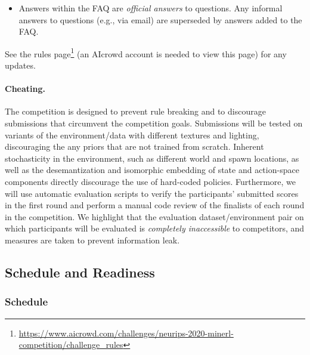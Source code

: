 \begin{itemize}
\begin{itemize}
    \item Answers within the FAQ are \textit{official answers} to questions. Any informal answers to questions (e.g., via email) are superseded by answers added to the FAQ.
\end{itemize}

\end{itemize}

See the rules page\footnote{\url{https://www.aicrowd.com/challenges/neurips-2020-minerl-competition/challenge_rules}} (an AIcrowd account is needed to view this page) for any updates.

\paragraph{Cheating.}
The competition is designed to prevent rule breaking and to discourage submissions that circumvent the competition goals.
Submissions will be tested on variants of the environment/data with different textures and lighting,
discouraging the any priors that are not trained from scratch. 
Inherent stochasticity in the environment, such as different world and spawn locations, as well as the desemantization and isomorphic embedding of state and action-space components directly discourage the use of hard-coded policies. 
Furthermore, we will use automatic evaluation scripts to verify the participants' submitted scores in the first round
and perform a manual code review of the finalists of each round in the competition. We highlight that the evaluation dataset/environment pair on which participants will be evaluated is \emph{completely inaccessible} to competitors, and measures are taken to prevent information leak.

\subsection{Schedule and Readiness}

\subsubsection{Schedule}  

